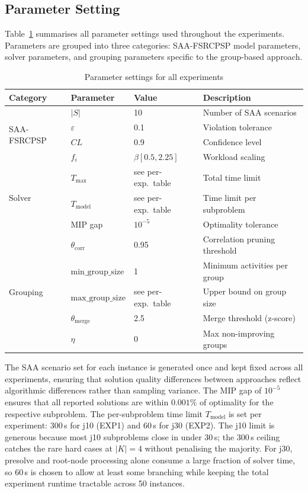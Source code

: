 \subsection{Parameter Setting}
\label{subsec:params}
Table~\ref{tab:params_exp} summarises all parameter settings
used throughout the experiments. Parameters are grouped into
three categories: SAA-FSRCPSP model parameters, solver
parameters, and grouping parameters specific to the group-based
approach.
\begin{table}[htbp]
\centering
\renewcommand{\arraystretch}{1.4}
\caption{Parameter settings for all experiments}
\label{tab:params_exp}
\begin{tabular}{llll}
\hline
\textbf{Category} &
\textbf{Parameter} &
\textbf{Value} &
\textbf{Description} \\
\hline
\multirow{4}{*}{SAA-FSRCPSP}
    & $|S|$         & 10              & Number of SAA scenarios \\
    & $\varepsilon$ & 0.1             & Violation tolerance \\
    & $CL$          & 0.9             & Confidence level \\
    & $f_i$         & $\beta[0.5, 2.25]$ & Workload scaling \\
\hline
\multirow{3}{*}{Solver}
    & $T_{\max}$     & see per-exp.\ table & Total time limit \\
    & $T_{\mathrm{model}}$ & see per-exp.\ table & Time limit per subproblem \\
    & MIP gap        & $10^{-5}$           & Optimality tolerance \\
\hline
\multirow{5}{*}{Grouping}
    & $\theta_{\mathrm{corr}}$    & 0.95 & Correlation pruning threshold \\
    & $\mathrm{min\_group\_size}$ & 1    & Minimum activities per group \\
    & $\mathrm{max\_group\_size}$ & see per-exp.\ table & Upper bound on group size \\
    & $\theta_{\mathrm{merge}}$   & 2.5  & Merge threshold (z-score) \\
    & $\eta$                      & 0    & Max non-improving groups \\
\hline
\end{tabular}
\end{table}
\noindent
The SAA scenario set for each instance is generated once and
kept fixed across all experiments, ensuring that solution
quality differences between approaches reflect algorithmic
differences rather than sampling variance. The MIP gap of
$10^{-5}$ ensures that all reported solutions are within
$0.001\%$ of optimality for the respective subproblem.
The per-subproblem time limit $T_{\mathrm{model}}$ is set
per experiment: 300\,s for j10 (EXP1) and 60\,s for j30
(EXP2). The j10 limit is generous because most j10 subproblems
close in under 30\,s; the 300\,s ceiling catches the rare
hard cases at $|K|=4$ without penalising the majority. For
j30, presolve and root-node processing alone consume a large
fraction of solver time, so 60\,s is chosen to allow at least
some branching while keeping the total experiment runtime
tractable across 50 instances.
